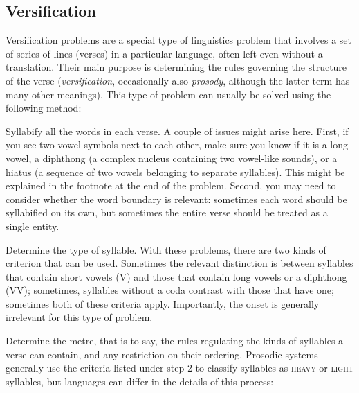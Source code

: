 \begin{refsection}
\section{Versification}

Versification problems are a special type of linguistics problem that involves a set of series of lines (verses) in a particular language, often left even without a translation. Their main purpose is determining the rules governing the structure of the verse (\textit{versification}, occasionally also \textit{prosody}, although the latter term has many other meanings). This type of problem can usually be solved using the following method:

\begin{description}[labelwidth={\widthof{Step 3.}},leftmargin=!]

\item[{Step 1.}] Syllabify all the words in each verse. A couple of issues might arise here. First, if you see two vowel symbols next to each other, make sure you know if it is a long vowel, a diphthong (a complex nucleus containing two vowel-like sounds), or a hiatus (a sequence of two vowels belonging to separate syllables). This might be explained in the footnote at the end of the problem. Second, you may need to consider whether the word boundary is relevant: sometimes each word should be syllabified on its own, but sometimes the entire verse should be treated as a single entity.

\item[{Step 2.}] Determine the type of syllable. With these problems, there are two kinds of criterion that can be used. Sometimes the relevant distinction is between syllables that contain short vowels (V) and those that contain long vowels or a diphthong (VV); sometimes, syllables without a coda contrast with those that have one; sometimes both of these criteria apply. Importantly, the onset is generally irrelevant for this type of problem.

\item[{Step 3.}] Determine the metre, that is to say, the rules regulating the kinds of syllables a verse can contain, and any restriction on their ordering. Prosodic systems generally use the criteria listed under step 2 to classify syllables as \textsc{heavy} or \textsc{light} syllables, but languages can differ in the details of this process:


\end{description}
\end{refsection}
